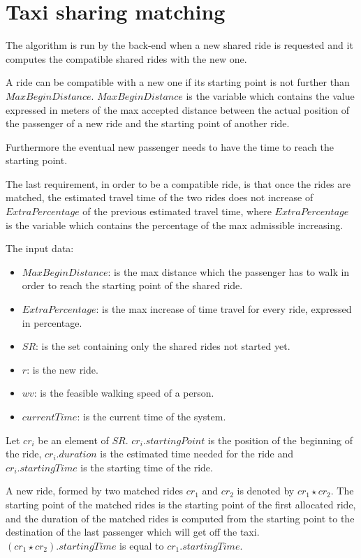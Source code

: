 \section{Taxi sharing matching}
\label{sec:taxi-sharing-matching}
The algorithm is run by the back-end when a new shared ride is requested and it computes the compatible shared rides with the new one.

A ride can be compatible with a new one if its starting point is not further than $MaxBeginDistance$. $MaxBeginDistance$ is the variable which contains the value expressed in meters of the max accepted distance between the actual position of the passenger of a new ride and the starting point of another ride.

Furthermore the eventual new passenger needs to have the time to reach the starting point.

The last requirement, in order to be a compatible ride, is that once the rides are matched, the estimated travel time of the two rides does not increase of $ExtraPercentage$ of the previous estimated travel time, where $ExtraPercentage$ is the variable which contains the percentage of the max admissible increasing.

The input data:
\begin{itemize}
	\item $MaxBeginDistance$: is the max distance which the passenger has to walk in order to reach the starting point of the shared ride.
	\item $ExtraPercentage$: is the max increase of time travel for every ride, expressed in percentage.
	\item $SR$: is the set containing only the shared rides not started yet.
	\item $r$: is the new ride.
	\item $wv$: is the feasible walking speed of a person.
	\item $currentTime$: is the current time of the system.
\end{itemize}

Let $cr_i$ be an element of $SR$. $cr_i.startingPoint$ is the position of the beginning of the ride, $cr_i.duration$ is the estimated time needed for the ride and $cr_i.startingTime$ is the starting time of the ride.

A new ride, formed by two matched rides $cr_1$ and $cr_2$ is denoted by $ cr_1 \star cr_2 $. The starting point of the matched rides is the starting point of the first allocated ride, and the duration of the matched rides is computed from the starting point to the destination of the last passenger which will get off the taxi. $ (cr_1 \star cr_2).startingTime $ is equal to $cr_1.startingTime$.

